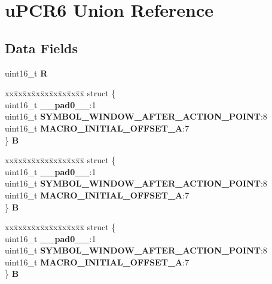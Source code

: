 \hypertarget{unionuPCR6}{}\section{u\+P\+C\+R6 Union Reference}
\label{unionuPCR6}
\subsection*{Data Fields}
\begin{DoxyCompactItemize}
\item 
\mbox{\label{unionuPCR6_a510e30ec4e6bbf588a79830f4ce3fb53}} 
uint16\+\_\+t {\bfseries R}
\item 
\mbox{\label{unionuPCR6_a9695842689d8059c7139acc68a4c56e5}} 
\begin{tabbing}
xx\=xx\=xx\=xx\=xx\=xx\=xx\=xx\=xx\=\kill
struct \{\\
\>uint16\_t {\bfseries \_\_pad0\_\_}:1\\
\>uint16\_t {\bfseries SYMBOL\_WINDOW\_AFTER\_ACTION\_POINT}:8\\
\>uint16\_t {\bfseries MACRO\_INITIAL\_OFFSET\_A}:7\\
\} {\bfseries B}\\

\end{tabbing}\item 
\mbox{\label{unionuPCR6_a9123458700a7a2cea23ecbb6c5a90b94}} 
\begin{tabbing}
xx\=xx\=xx\=xx\=xx\=xx\=xx\=xx\=xx\=\kill
struct \{\\
\>uint16\_t {\bfseries \_\_pad0\_\_}:1\\
\>uint16\_t {\bfseries SYMBOL\_WINDOW\_AFTER\_ACTION\_POINT}:8\\
\>uint16\_t {\bfseries MACRO\_INITIAL\_OFFSET\_A}:7\\
\} {\bfseries B}\\

\end{tabbing}\item 
\mbox{\label{unionuPCR6_a08346b2796fdb27374abb53a8d85c235}} 
\begin{tabbing}
xx\=xx\=xx\=xx\=xx\=xx\=xx\=xx\=xx\=\kill
struct \{\\
\>uint16\_t {\bfseries \_\_pad0\_\_}:1\\
\>uint16\_t {\bfseries SYMBOL\_WINDOW\_AFTER\_ACTION\_POINT}:8\\
\>uint16\_t {\bfseries MACRO\_INITIAL\_OFFSET\_A}:7\\
\} {\bfseries B}\\


\end{tabbing}
\end{DoxyCompactItemize}
